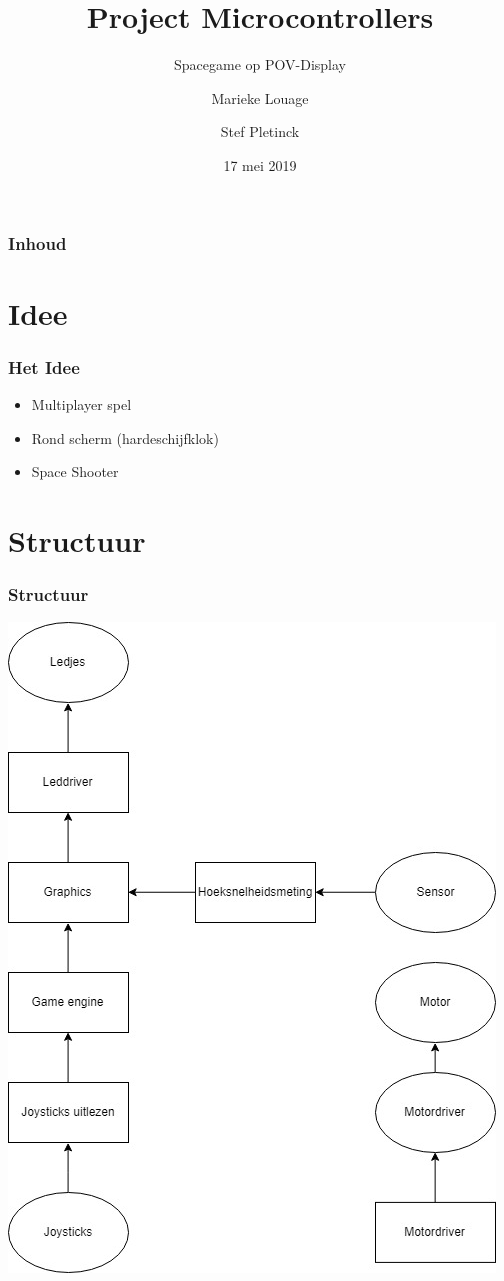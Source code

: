 \documentclass{beamer}
\title{Project Microcontrollers}
\subtitle{Spacegame op POV-Display}
\author{Marieke Louage \and Stef Pletinck}
\institute{UGent Campus Kortrijk}
\date{17 mei 2019}
\begin{document}
\frame{\titlepage}

\begin{frame}
  \frametitle{Inhoud}
  \tableofcontents
\end{frame}

\section{Idee}
\begin{frame}
  \frametitle{Het Idee}
  \begin{itemize}
  \item<1-> Multiplayer spel
  \item<2-> Rond scherm (hardeschijfklok)
  \item<3-> Space Shooter
  \end{itemize}
\end{frame}

\section{Structuur}
\begin{frame}
  \frametitle{Structuur}
  \begin{center}
    \includegraphics[height=0.8\textheight]{img/structuur.jpg}
  \end{center}
\end{frame}
\end{document}
